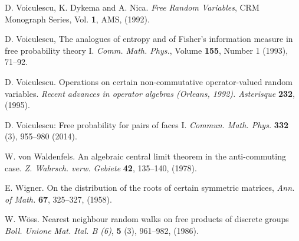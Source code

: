 \documentclass[ECP]{ejpecp} %
\begin{document}
\begin{thebibliography}{99}
 D. Voiculescu, K. Dykema and A. Nica. \emph{Free Random Variables}, CRM Monograph Series, Vol. {\bf 1}, AMS, (1992).

 D. Voiculescu, The analogues of entropy and of Fisher's information measure in free probability theory I. \emph{Comm. Math. Phys.}, Volume {\bf 155}, Number 1 (1993), 71--92.

 D. Voiculescu. Operations on certain non-commutative operator-valued random
variables. \emph{Recent advances in operator algebras (Orleans, 1992). Asterisque} {\bf 232}, (1995).

 D. Voiculescu: Free probability for pairs of faces I. \emph{Commun. Math. Phys.} {\bf 332} (3), 955--980 (2014).

 W. von Waldenfels. An algebraic central limit theorem in the anti-commuting case. \emph{Z.
Wahrsch. verw. Gebiete} {\bf 42}, 135--140, (1978).

 E. Wigner. On the distribution of the roots of certain symmetric matrices, \emph{Ann. of Math.} {\bf 67}, 325--327, (1958).

 W. W\"oss. Nearest neighbour random walks on free products of discrete groups
\emph{Boll. Unione Mat. Ital. B (6)}, {\bf 5} (3), 961--982, (1986).


\end{thebibliography}



 
\end{document}
